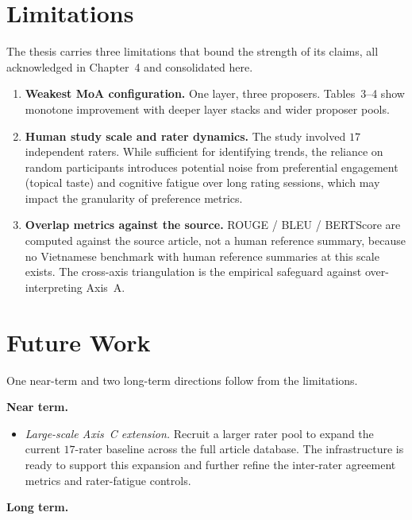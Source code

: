 \section{Limitations}

The thesis carries three limitations that bound the strength of its
claims, all acknowledged in Chapter~4 and consolidated here.

\begin{enumerate}
  \item \textbf{Weakest MoA configuration.} One layer, three
        proposers. \cite{Wang2024} Tables~3--4 show monotone
        improvement with deeper layer stacks and wider proposer
        pools.
  \item \textbf{Human study scale and rater dynamics.} The study 
        involved $17$ independent raters. While sufficient for 
        identifying trends, the reliance on random participants 
        introduces potential noise from preferential engagement 
        (topical taste) and cognitive fatigue over long rating 
        sessions, which may impact the granularity of preference 
        metrics.
  \item \textbf{Overlap metrics against the source.} ROUGE / BLEU /
        BERTScore are computed against the source article, not a
        human reference summary, because no Vietnamese benchmark with
        human reference summaries at this scale exists. The
        cross-axis triangulation is the empirical safeguard against
        over-interpreting Axis~A.
\end{enumerate}

\section{Future Work}

One near-term and two long-term directions follow from the
limitations.

\textbf{Near term.}

\begin{itemize}
  \item \textit{Large-scale Axis~C extension.} Recruit a larger rater pool
        to expand the current $17$-rater baseline across the full article
        database. The infrastructure is ready
        to support this expansion and further refine the inter-rater
        agreement metrics and rater-fatigue controls.
\end{itemize}

\textbf{Long term.}

